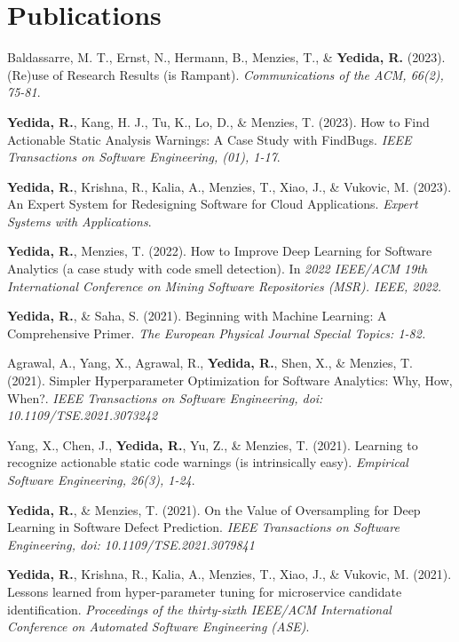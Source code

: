 \section{Publications}
 \resumeNumberedSubHeadingListStart
    \item
      {Baldassarre, M. T., Ernst, N., Hermann, B., Menzies, T., \& \textbf{Yedida, R.} (2023). (Re)use of Research Results (is Rampant). \textit{Communications of the ACM, 66(2), 75-81}.
      }
    \item
      {\textbf{Yedida, R.}, Kang, H. J., Tu, K., Lo, D., \& Menzies, T. (2023). How to Find Actionable Static Analysis Warnings: A Case Study with FindBugs. \textit{IEEE Transactions on Software Engineering, (01), 1-17}.}
    \item
      {\textbf{Yedida, R.}, Krishna, R., Kalia, A., Menzies, T., Xiao, J., \& Vukovic, M. (2023). An Expert System for Redesigning Software for Cloud Applications. \textit{Expert Systems with Applications}.}
    \item
      {\textbf{Yedida, R.}, Menzies, T. (2022). How to Improve Deep Learning for Software Analytics (a case study with code smell detection). In \textit{2022 IEEE/ACM 19th International Conference on Mining Software Repositories (MSR). IEEE, 2022.}}
    \item
      {\textbf{Yedida, R.}, \& Saha, S. (2021). Beginning with Machine Learning: A Comprehensive Primer. \textit{The European Physical Journal Special Topics: 1-82.}}
    \item
      {Agrawal, A., Yang, X., Agrawal, R., \textbf{Yedida, R.}, Shen, X., \& Menzies, T. (2021). Simpler Hyperparameter Optimization for Software Analytics: Why, How, When?. \textit{IEEE Transactions on Software Engineering, doi: 10.1109/TSE.2021.3073242}}
    \item
      {Yang, X., Chen, J., \textbf{Yedida, R.}, Yu, Z., \& Menzies, T. (2021). Learning to recognize actionable static code warnings (is intrinsically easy). \textit{Empirical Software Engineering, 26(3), 1-24}.}
    \item
      {\textbf{Yedida, R.}, \& Menzies, T. (2021). On the Value of Oversampling for Deep Learning in Software Defect Prediction. \textit{IEEE Transactions on Software Engineering, doi: 10.1109/TSE.2021.3079841}}
    \item
      {\textbf{Yedida, R.}, Krishna, R., Kalia, A., Menzies, T., Xiao, J., \& Vukovic, M. (2021). Lessons learned from hyper-parameter tuning for microservice candidate identification. \textit{Proceedings of the thirty-sixth IEEE/ACM International Conference on Automated Software Engineering (ASE)}.
      }
